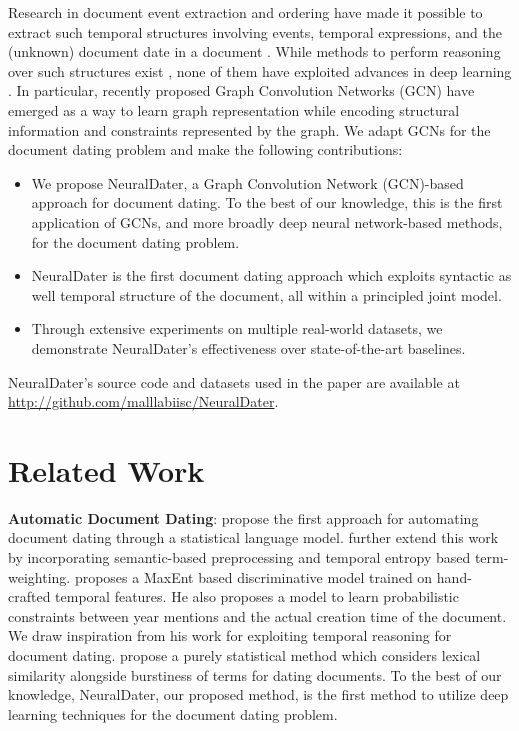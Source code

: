 \documentclass[11pt,a4paper]{article}
\newcommand{\method}{NeuralDater}
\begin{document}
Research in document event extraction and ordering have made it possible to extract such temporal structures involving events, temporal expressions, and the (unknown) document date in a document \cite{catena_paper,Chambers14}. While methods to perform reasoning over such structures exist \cite{tempeval07,tempeval10,tempeval13,tempeval15,timebank03}, none of them have exploited advances in deep learning \cite{alexnet,microsoft_speech,deep_learning_book}. In particular, recently proposed Graph Convolution Networks (GCN) \cite{Defferrard:2016:CNN:3157382.3157527,kipf2016semi} have emerged as a way to learn graph representation while encoding structural information and constraints represented by the graph. We adapt GCNs for the document dating problem and make the following contributions:



\begin{itemize}
	\item We propose \method{}, a Graph Convolution Network (GCN)-based approach for document dating. To the best of our knowledge, this is the first application of GCNs, and more broadly deep neural network-based methods, for the document dating problem.
	\item NeuralDater is the first document dating approach which exploits syntactic as well temporal structure of the document, all within a principled joint model.
	\item Through extensive experiments on multiple real-world datasets, we demonstrate \method{}'s effectiveness over state-of-the-art baselines.
\end{itemize}

\method{}'s source code and datasets used in the paper are available at \url{http://github.com/malllabiisc/NeuralDater}. \section{Related Work}
\label{sec:related_work}

{\bf Automatic Document Dating}:
\citet{de_jong05} propose the first approach for automating document dating through a statistical language model. \citet{Kanhabua:2008:ITL:1429852.1429902} further extend this work by incorporating semantic-based preprocessing and temporal entropy \cite{temporal_entropy} based term-weighting. 
\citet{Chambers:2012:LDT:2390524.2390539} proposes a MaxEnt based discriminative model trained on hand-crafted temporal features. He also proposes a model to learn probabilistic constraints between year mentions and the actual creation time of the document. We draw inspiration from his work for exploiting temporal reasoning for document dating. 
\citet{Kotsakos:2014:BAD:2600428.2609495} propose a purely statistical method which considers lexical similarity alongside burstiness \cite{Lappas:2009:BSD:1557019.1557075} of terms for dating documents. To the best of our knowledge, \method{}, our proposed method,  is the first method to utilize deep learning techniques for the document dating problem.
\end{document}
